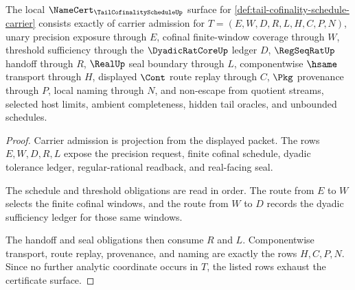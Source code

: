 \begin{theorem}
\label{thm:tail-cofinality-schedule-namecert-obligations}
The local $\NameCert_{\TailCofinalityScheduleUp}$ surface for \autoref{def:tail-cofinality-schedule-carrier} consists exactly of carrier admission for $T=(E,W,D,R,L,H,C,P,N)$, unary precision exposure through $E$, cofinal finite-window coverage through $W$, threshold sufficiency through the $\DyadicRatCoreUp$ ledger $D$, $\RegSeqRatUp$ handoff through $R$, $\RealUp$ seal boundary through $L$, componentwise $\hsame$ transport through $H$, displayed $\Cont$ route replay through $C$, $\Pkg$ provenance through $P$, local naming through $N$, and non-escape from quotient streams, selected host limits, ambient completeness, hidden tail oracles, and unbounded schedules.
\end{theorem}
\begin{proof}
Carrier admission is projection from the displayed packet. The rows $E,W,D,R,L$ expose the precision request, finite cofinal schedule, dyadic tolerance ledger, regular-rational readback, and real-facing seal.

The schedule and threshold obligations are read in order. The route from $E$ to $W$ selects the finite cofinal windows, and the route from $W$ to $D$ records the dyadic sufficiency ledger for those same windows.

The handoff and seal obligations then consume $R$ and $L$. Componentwise transport, route replay, provenance, and naming are exactly the rows $H,C,P,N$. Since no further analytic coordinate occurs in $T$, the listed rows exhaust the certificate surface.
\end{proof}

